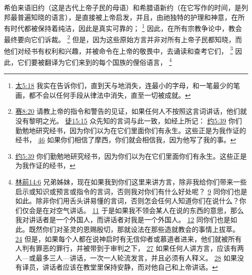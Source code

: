 \documentclass[12pt, a4paper, oneside]{ctexart}
\newcounter{parnum}[section]
\newcommand{\N}{%
   \noindent\refstepcounter{parnum}%
    \makebox[\parindent][l]{\textbf{\arabic{parnum}.}}}
\begin{document}
\N 希伯来语旧约（这是古代上帝子民的母语）和希腊语新约（在它写作的时间，是列邦最普遍知晓的语言），是直接被上帝启发，并且，由祂独特的护理和神意，在所有时代都被保持着纯洁，因此是真实可靠的；
	\footnote {
		\href{https://biblehub.com/matthew/5-18.htm}{太5:18} 我实在告诉你们，直到天与地消失，连最小的字母，和一笔最少的笔画，都不会以任何手段从律法中消失，直至一切被成就。
	}
	因此，在所有宗教争论中，教会最终要向它们诉裁。
	\footnote {
		\href{https://biblehub.com/isaiah/8-20.htm}{赛8:20} 请教上帝的指令和警告的见证，如果任何人不按照这言词讲话，他们就没有黎明之光。
		\href{https://biblehub.com/acts/15-15.htm}{徒15:15} 众先知的言词与此一致，如经上所记：
		\href{https://biblehub.com/john/5-39.htm}{约5:39} 你们勤勉地研究经书，因为你们以为在它们里面你们有永生。这些正是为我作证的经书，
		\href{https://biblehub.com/john/5-46.htm}{46} 如果你们相信了摩西，你们就会相信我，因为他写了我的事。
	}
	但是，因为这些原始方言并非对所有上帝子民都知晓，而他们对经书有权利和兴趣，并被命令在上帝的敬畏中，去诵读和查考它们，
	\footnote {
		\href{https://biblehub.com/john/5-39.htm}{约5:39} 你们勤勉地研究经书，因为你们以为在它们里面你们有永生。这些正是为我作证的经书，
	}
	因此，它们要被翻译为它们来到的每个国族的俚俗语言，
	\footnote {
		\href{https://biblehub.com/1_corinthians/14-6.htm}{林前14:6} 兄弟姊妹，现在如果我到你们这里来讲方言，除非我给你们带来一些启示或知识或预言或指令的言词，否则我对你们有什么好处呢？
		\href{https://biblehub.com/1_corinthians/14-9.htm}{9} 同你们也是如此。除非你们用舌头讲易懂的言词，否则怎会任何人知道你们在说什么？你们仅会是在对空气讲话。
		\href{https://biblehub.com/1_corinthians/14-11.htm}{11} 于是如果我不领会某人在说的东西的意思，那么我对讲话者是一个外国人，而讲话者对我是一个外国人。
		\href{https://biblehub.com/1_corinthians/14-12.htm}{12} 同你们也是如此。既然你们对圣灵的恩赐殷切，那就设法在那些造就教会的事情上拔萃。
		\href{https://biblehub.com/1_corinthians/14-24.htm}{24} 但是，如果每个人都在说神启时有无信仰者或慕道者进来，他们就被所有人判有罪恶的罪行，并被带到于审判之下，
		\href{https://biblehub.com/1_corinthians/14-27.htm}{27} 如果任何人讲方言，应该有两人---或最多三人---讲话，一次一人轮流发言，并且必须有人释义。
		\href{https://biblehub.com/1_corinthians/14-28.htm}{28} 如果没有译员，讲话者应该在教堂里保持安静，而对他自己和上帝讲话。
	}
\end{document}
